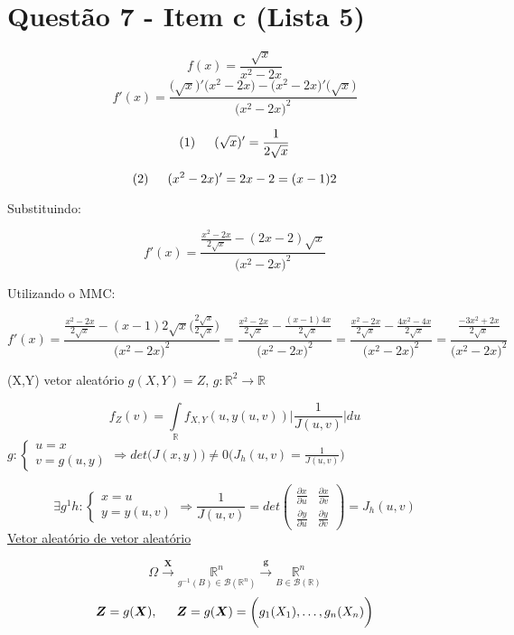 \documentclass[a4paper,12pt]{article}
\begin{document}
	 \newpage
	 	\section*{Questão 7 - Item c (Lista 5) }
	 $$f(x)=\frac{\sqrt x}{x^2 - 2x} $$
	 $$f'(x) = 
	 \frac{
	\bigg(\sqrt x\bigg)'\bigg(x^2-2x\bigg) - \bigg(x^2-2x\bigg)'\bigg(\sqrt x\bigg) 
 }{\bigg(x^2-2x\bigg)^2}
	  $$
	  
	  $$ 
	  (1)\indent (\sqrt x)' = \frac{1}{2\sqrt x}
	  $$
	  
	  $$
	  (2)\indent (x^2-2x)' = 2x-2=(x-1)2
	  $$
	  \begin{center}Substituindo:\end{center}
	  $$
	  f'(x)=\frac{
	  	\frac{x^2-2x}{2\sqrt x}	  
	  	- (2x-2)\sqrt x 
  }{\bigg(x^2-2x\bigg)^2}
	  $$
	 \begin{center} Utilizando o MMC: \end{center}
	 	  $$
	 f'(x)=\frac{
	 	\frac{x^2-2x}{2\sqrt x}	  
	 	- (x-1)2\sqrt x \bigg(\frac{2\sqrt x}{2\sqrt x}\bigg)
	 }{\bigg(x^2-2x\bigg)^2}
 =
\frac{
 	\frac{x^2-2x}{2\sqrt x}	  
 	-  \frac{(x-1)4x}{2\sqrt x}
 }{\bigg(x^2-2x\bigg)^2}
 =
\frac{
	\frac{x^2-2x}{2\sqrt x}	  
	-  \frac{4x^2-4x}{2\sqrt x}
}{\bigg(x^2-2x\bigg)^2}
=
\frac{
	\frac{-3x^2+2x}{2\sqrt x}	  
}{\bigg(x^2-2x\bigg)^2}
	 $$
	
	\newpage
	
	(X,Y) vetor aleatório $g(X,Y)=Z$, $g:\mathbb R^2\rightarrow \mathbb R$
	
	$$f_Z(v)= \int\limits_{\mathbb R} f_{X,Y}(u,y(u,v))\bigg|\frac{1}{J(u,v)}\bigg|du $$
	$g:\begin{cases}
	u=x\\
	v=g(u,y)
	\end{cases}
	\Rightarrow det\bigg(J(x,y)\bigg)\ne 0 \bigg(J_h(u,v)=\frac{1}{J(u,v)}\bigg)
	$
	
	$$\exists g^{1}h:\begin{cases}
	x=u\\
	y=y(u,v)
	\end{cases} 
	\Rightarrow 
	\frac{1}{J(u,v)}=det\begin{pmatrix}
	\frac{\partial x}{\partial u}& \frac{\partial x}{\partial v}  \\
		\frac{\partial y}{\partial u}& \frac{\partial y}{\partial v}  
	\end{pmatrix}=J_h(u,v)
	$$
	\newpage
	\underline{Vetor aleatório de vetor aleatório}
	
	$$\Omega  \overset{\bm X}{\longrightarrow}  
\underset{g^{-1}(B)\in \mathscr{B}(\mathbb{R}^n) }{\mathbb R^n}
\overset{\bm g}{\longrightarrow} 
\underset{B \in \mathscr{B}(\mathbb{R}) }{\mathbb R^n}
$$
	$$\bm Z = g(\bm X), \indent \bm Z = g(\bm X)= \bigg(
	g_1(X_1),\ldots,g_n( X_n)
	\bigg)$$
	
\end{document}
